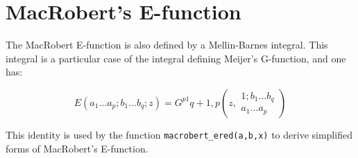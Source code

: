 \documentclass[11pt]{article}
\begin{document}
\section{MacRobert's E-function}

The MacRobert E-function\cite{macrobert1958,macrobert1959c,macrobert1959b,macrobert1959a,macrobert1959,macrobert1960,macrobert1960a,macrobert1961,macrobert1961a,macrobert1962,macrobert1962a,ragab1962,ragab1993,ragab1962a,ragab1954} is also defined by a Mellin-Barnes integral. 
This integral is a particular case of the integral defining 
Meijer's G-function, and one has:

\begin{equation}
  E(a_1\ldots a_p;b_1\ldots b_q;z)=G^{p1}{q+1,p}\left(z,\begin{array}{c} 1;b_1\ldots b_q\\ a_1\ldots a_p \end{array} \right)
\end{equation}

This identity is used by the function \texttt{macrobert\_ered(a,b,x)} to derive simplified forms of MacRobert's E-function.

 

% 
%
\end{document}

